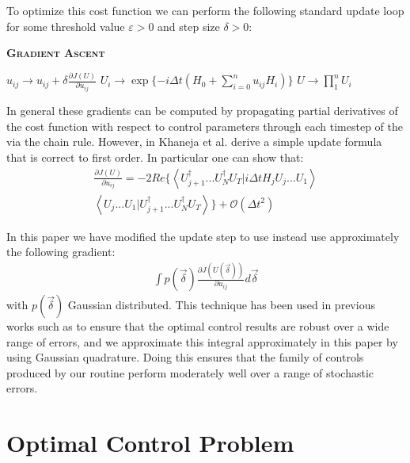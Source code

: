 \documentclass[aps,nofootinbib,pra,notitlepage,twocolumn]{revtex4-1}
\newcommand{\braket}[2]{\left\langle #1 | #2 \right\rangle}
\begin{document}
To optimize this cost function we can perform the following standard update loop for some threshold value $\varepsilon > 0$ and step size $\delta > 0$:
\begin{algorithm}[H]
  \caption{\textsc{\textbf{Gradient Ascent}}}
  \begin{algorithmic}
    \State $u_{ij} \rightarrow u_{ij} + \delta\frac{\partial J(U)}{\partial u_{ij}}$
    \State $U_i \rightarrow \exp\{-i\Delta t(H_0 + \sum_{i=0}^{n}u_{ij}H_i)\}$
    \EndFor
    \State $U \rightarrow \prod_1^nU_i$
    \EndWhile 
  \end{algorithmic}
\end{algorithm}

In general these gradients can be computed by propagating partial derivatives of the cost function with respect to control parameters through each timestep of the  via the chain rule. However, in \cite{Khaneja2005} Khaneja et al. derive a simple update formula that is correct to first order. In particular one can show that:
\begin{align}
\frac{\partial J(U)}{\partial u_{ij}} = -2Re\{\braket{{U_{j+1}^{\dagger}...U_N^{\dagger} U_T}}{i\Delta tH_jU_j...U_1}\\
\braket{U_j...U_1}{U_{j+1}^{\dagger}...U_N^{\dagger} U_T}\} +  \mathcal{O}(\Delta t^2)
\end{align}

In this paper we have modified the update step to use instead use approximately the following gradient:
\begin{align}\label{quadrature}
\int p(\vec{\delta})\frac{\partial J(U(\vec{\delta}))}{\partial u_{ij}} d\vec{\delta}
\end{align}
with $p(\vec{\delta})$ Gaussian distributed. This technique has been used in previous works such as \cite{Goerz2014} to ensure that the optimal control results are robust over a wide range of errors, and we approximate this integral approximately in this paper by using Gaussian quadrature. Doing this ensures that the family of controls produced by our routine perform moderately well over a range of stochastic errors.

\section{Optimal Control Problem}\label{ocp}
\end{document}
